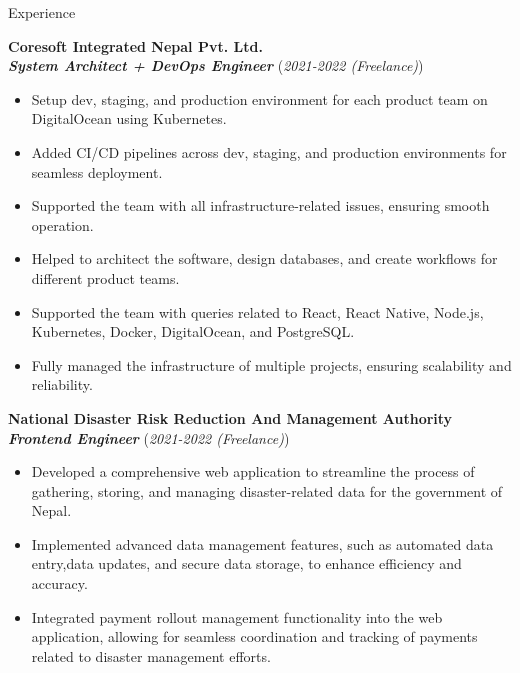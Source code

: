 \documentclass{resume} %
\begin{document}
\begin{rSection}{Experience}
\begin{enumerate}
    \end{enumerate}

    \large{{\bf Coresoft Integrated Nepal Pvt. Ltd.}}
    \\ \small{\textit{\textbf{System Architect + DevOps Engineer}}} (\small{\textit{2021-2022 (Freelance)}})

    \begin{itemize}
        \item Setup dev, staging, and production environment for each product team on DigitalOcean using Kubernetes.
        \item Added CI/CD pipelines across dev, staging, and production environments for seamless deployment.
        \item Supported the team with all infrastructure-related issues, ensuring smooth operation.
        \item Helped to architect the software, design databases, and create workflows for different product teams.
        \item Supported the team with queries related to React, React Native, Node.js, Kubernetes, Docker, DigitalOcean, and PostgreSQL.
        \item Fully managed the infrastructure of multiple projects, ensuring scalability and reliability.
    \end{itemize}

    \large{{\bf National Disaster Risk Reduction And Management Authority}}
    \\ \small{\textit{\textbf{Frontend Engineer}}} (\small{\textit{2021-2022 (Freelance)}})

    \begin{itemize}
        \item Developed a comprehensive web application to streamline the process of gathering, storing, and managing disaster-related data for the government of Nepal.
        \item Implemented advanced data management features, such as automated data entry,data updates, and secure data storage, to enhance efficiency and accuracy.
        \item Integrated payment rollout management functionality into the web application, allowing for seamless coordination and tracking of payments related to disaster management efforts.


    \end{itemize}



\end{rSection}
\end{document}
